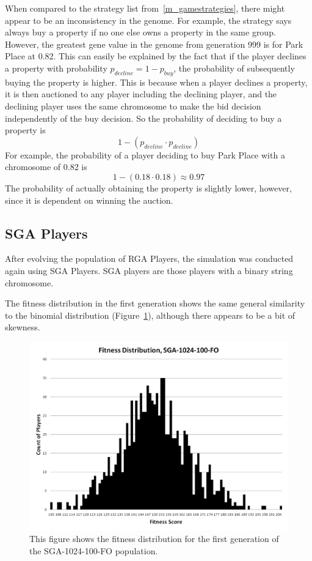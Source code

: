 When compared to the strategy list from~\ref{m_gamestrategies}, there might
appear to be an inconsistency in the genome. For example, the strategy says
always buy a property if no one else owns a property in the same group. However,
the greatest gene value in the genome from generation 999 is for Park Place at
0.82. This can easily be explained by the fact that if the player declines a
property with probability \(p_{decline} = 1-p_{buy}\), the probability of
subsequently buying the property is higher. This is because when a player
declines a property, it is then auctioned to any player including the declining
player, and the declining player uses the same chromosome to make the bid
decision independently of the buy decision. So the probability of deciding to
buy a property is
\begin{equation*}
1-(p_{decline} \cdot p_{decline})
\end{equation*}
For example, the probability of a player deciding to buy Park Place with a
chromosome of 0.82 is
\begin{equation*}
1-(0.18 \cdot 0.18) \approx 0.97
\end{equation*}
The probability of actually obtaining the property is slightly lower, however,
since it is dependent on winning the auction.

\subsection{SGA Players} \label{6_SGA}

After evolving the population of RGA Players, the simulation was conducted again
using SGA Players. SGA players are those players with a binary string
chromosome.

The fitness distribution in the first generation shows the same general
similarity to the binomial distribution (Figure~\ref{figure-sga_gen0}), although
there appears to be a bit of skewness.

\begin{figure}[htp]
\centerline{\includegraphics[width=0.75\columnwidth]{Figures/SGA_1024_100_FO_gen0.png}}
\caption[SGA-1024-100-FO Fitness Generation 0]{This figure shows the fitness
distribution for the first generation of the SGA-1024-100-FO population.}
\label{figure-sga_gen0}
\end{figure}


